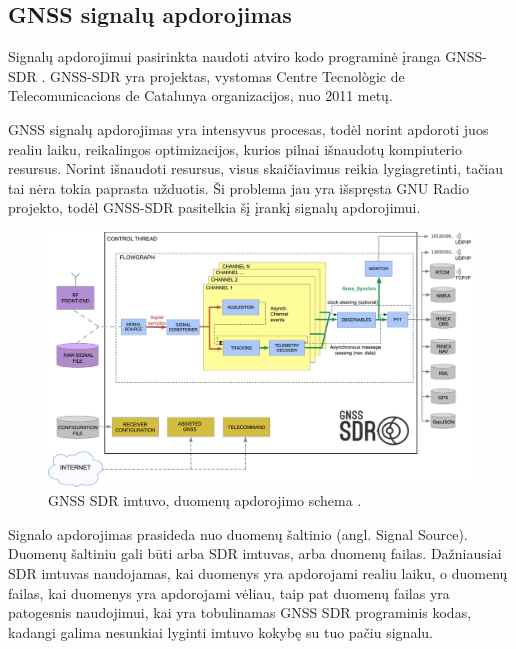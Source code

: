 \documentclass[main.tex]{subfiles}
\begin{document}
\subsection{GNSS signalų apdorojimas}

Signalų apdorojimui pasirinkta naudoti atviro kodo programinė įranga
GNSS-SDR \cite{GNSS-SDR11}. GNSS-SDR yra projektas, vystomas
Centre Tecnològic de Telecomunicacions de Catalunya organizacijos,
nuo 2011 metų.

GNSS signalų apdorojimas yra intensyvus procesas,
todėl norint apdoroti juos realiu laiku, reikalingos optimizacijos,
kurios pilnai išnaudotų kompiuterio resursus. Norint išnaudoti resursus,
visus skaičiavimus reikia lygiagretinti, tačiau tai nėra tokia
paprasta užduotis. Ši problema jau yra išspręsta GNU Radio projekto,
todėl GNSS-SDR pasitelkia šį įrankį signalų apdorojimui.

\begin{figure}[h]
    \begin{centering}
    \includegraphics[scale=12.0]{drawings/GeneralBlockDiagram}
    \par\end{centering}
    \protect\caption{\label{fig:gnss_sdr_block}GNSS SDR imtuvo, duomenų apdorojimo schema \cite{gnss_sdr_web}.}
\end{figure}

Signalo apdorojimas prasideda nuo duomenų šaltinio (angl. Signal Source). Duomenų šaltiniu
gali būti arba SDR imtuvas, arba duomenų failas. Dažniausiai SDR imtuvas naudojamas,
kai duomenys yra apdorojami realiu laiku, o duomenų failas, kai duomenys yra apdorojami
vėliau, taip pat duomenų failas yra patogesnis naudojimui, kai yra tobulinamas GNSS SDR
programinis kodas, kadangi galima nesunkiai lyginti imtuvo kokybę su tuo pačiu signalu.
\end{document}
